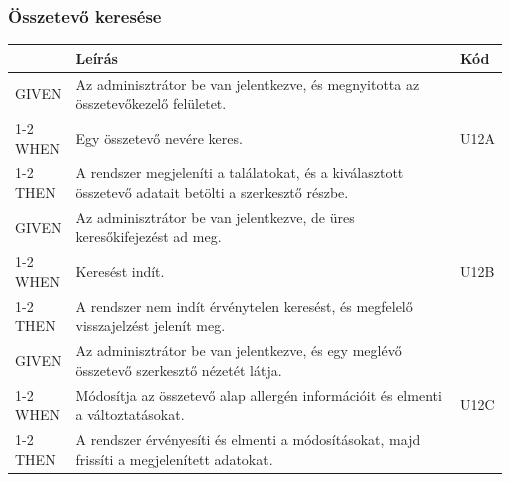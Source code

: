 \subsubsection{Összetevő keresése}
\begin{table}[H]
	\centering
	\begin{tabular}{|m{0.12\linewidth}|m{0.78\linewidth}|m{0.08\linewidth}|}
		\hline
		& \textbf{Leírás} & \textbf{Kód} \\\hline
		GIVEN & Az adminisztrátor be van jelentkezve, és megnyitotta az összetevőkezelő felületet. & \multirow{3}{*}{U12A} \\\cline{1-2}
		WHEN  & Egy összetevő nevére keres. & \\\cline{1-2}
		THEN  & A rendszer megjeleníti a találatokat, és a kiválasztott összetevő adatait betölti a szerkesztő részbe. & \\\hline

		GIVEN & Az adminisztrátor be van jelentkezve, de üres keresőkifejezést ad meg. & \multirow{3}{*}{U12B} \\\cline{1-2}
		WHEN  & Keresést indít. & \\\cline{1-2}
		THEN  & A rendszer nem indít érvénytelen keresést, és megfelelő visszajelzést jelenít meg. & \\\hline

		GIVEN & Az adminisztrátor be van jelentkezve, és egy meglévő összetevő szerkesztő nézetét látja. & \multirow{3}{*}{U12C} \\\cline{1-2}
		WHEN  & Módosítja az összetevő alap allergén információit és elmenti a változtatásokat. & \\\cline{1-2}
		THEN  & A rendszer érvényesíti és elmenti a módosításokat, majd frissíti a megjelenített adatokat. & \\\hline
	\end{tabular}
\end{table}



